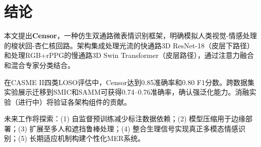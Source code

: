 
\section{结论}

本文提出\textbf{Censor}，一种仿生双通路微表情识别框架，明确模拟人类视觉-情感处理的梭状回-杏仁核回路。架构集成处理光流的快通路3D ResNet-18（皮层下路径）和处理RGB+rPPG的慢通路3D Swin Transformer（皮层路径），通过注意力融合和混合专家分类结合。

在CASME II四类LOSO评估中，Censor达到0.85准确率和0.80 F1分数。跨数据集实验展示迁移到SMIC和SAMM可获得0.74--0.76准确率，确认强泛化能力。消融实验（进行中）将验证各架构组件的贡献。

未来工作将探索：(1) 自监督预训练减少标注数据依赖；(2) 模型压缩用于边缘部署；(3) 扩展至多人和遮挡鲁棒处理；(4) 整合生理信号实现真正多模态情感识别；(5) 长期适应机制构建个性化MER系统。